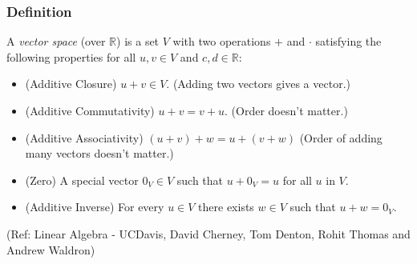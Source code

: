 \begin{frame}[fragile]
\frametitle{Definition}

\begin{definition} A \emph{vector space} (over $\mathbb{R}$) is a set $V$ with two operations $+$ and $\cdot$ satisfying the following properties for all $u, v \in V$ and $c, d \in \mathbb{R}$:

\begin{itemize}

\item[(+i)] (Additive Closure) $u+v \in V$.  (Adding two vectors gives a vector.)

\item[(+ii)] (Additive Commutativity) $u+v=v+u$.  (Order doesn't matter.)

\item[(+iii)] (Additive Associativity) $(u+v)+w = u+(v+w)$  (Order of adding many vectors doesn't matter.)

\item[(+iv)] (Zero) A special vector $0_V \in V$ such that $u+0_V = u$ for all $u$ in $V$.

\item[(+v)] (Additive Inverse) For every $u \in V$ there exists $w \in V$ such that $u+w=0_V$.


\end{itemize}
\end{definition}

\tiny{(Ref: Linear Algebra - UCDavis, David Cherney, Tom Denton, Rohit Thomas and Andrew Waldron)}

\end{frame}

